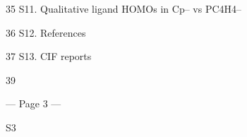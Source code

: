  
 
35 
S11. Qualitative ligand HOMOs in Cp– vs {PC4H4}– 
 
 
 
 
 
 
 
36 
S12. References 
 
 
 
 
 
 
 
 
 
 
 
 
 
 
37 
S13. CIF reports 
 
 
 
 
 
 
 
 
 
 
 
 
 
 
39 
 
 


--- Page 3 ---
 
 
S3 
 

